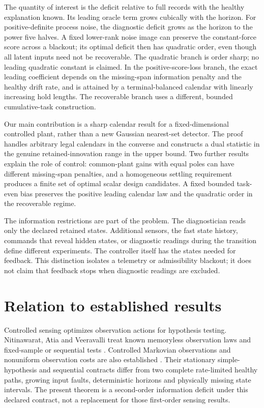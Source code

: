 \documentclass[11pt]{article}
\begin{document}
The quantity of interest is the deficit relative to full records with the healthy
explanation known. Its leading oracle term grows cubically with the horizon.
For positive-definite process noise, the diagnostic deficit grows as the
horizon to the power five halves. A fixed lower-rank noise image can preserve
the constant-force score across a blackout; its optimal deficit then has
quadratic order, even though all latent inputs need not be recoverable. The quadratic branch is order sharp; no leading quadratic constant is claimed.
In the positive-score-loss branch, the exact leading coefficient depends on the
missing-span information penalty and the healthy drift rate, and is attained by
a terminal-balanced calendar with linearly increasing hold lengths.
The recoverable branch uses a different, bounded cumulative-task construction.

Our main contribution is a sharp calendar result for a fixed-dimensional
controlled plant, rather than a new Gaussian nearest-set detector.
The proof handles arbitrary legal calendars in the converse and constructs a
dual statistic in the genuine retained-innovation range in the upper bound.
Two further results explain the role of control: common-plant gains with equal
poles can have different missing-span penalties, and a homogeneous settling
requirement produces a finite set of optimal scalar design candidates.
A fixed bounded task-even bias preserves the positive leading calendar law
and the quadratic order in the recoverable regime.

The information restrictions are part of the problem. The diagnostician reads
only the declared retained states. Additional sensors, the fast state history,
commands that reveal hidden states, or diagnostic readings during the transition
define different experiments. The controller itself has the states needed for
feedback. This distinction isolates a telemetry or admissibility blackout; it
does not claim that feedback stops when diagnostic readings are excluded.

\section{Relation to established results}
Controlled sensing optimizes observation actions for hypothesis testing.
Nitinawarat, Atia and Veeravalli treat known memoryless observation laws and
fixed-sample or sequential tests \cite{controlled}.
Controlled Markovian observations and nonuniform observation costs are also
established \cite{markov}. Their stationary simple-hypothesis and sequential
contracts differ from two complete rate-limited healthy paths, growing input
faults, deterministic horizons and physically missing state intervals.
The present theorem is a second-order information deficit under this declared
contract, not a replacement for those first-order sensing results.
\end{document}
